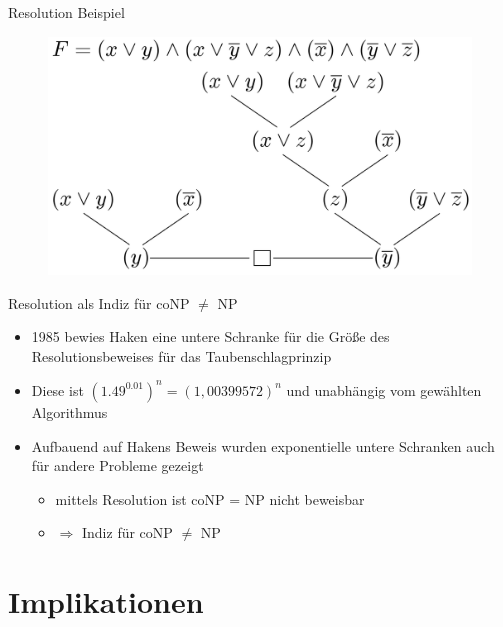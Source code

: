 \documentclass[ignorenonframetext,]{beamer}
\begin{document}
\begin{frame}{Resolution Beispiel}

\begin{figure}[htbp]
\centering
\includegraphics{img/res-beweis.png}
\end{figure}

\end{frame}

\begin{frame}{Resolution als Indiz für coNP $\neq$ NP}

\begin{itemize}
\itemsep1pt\parskip0pt
\item
  1985 bewies Haken eine untere Schranke für die Größe des
  Resolutionsbeweises für das Taubenschlagprinzip
\item
  Diese ist $(1.49^{0.01})^n = (1,00399572)^n$ und unabhängig vom
  gewählten Algorithmus
\item
  Aufbauend auf Hakens Beweis wurden exponentielle untere Schranken auch
  für andere Probleme gezeigt

  \begin{itemize}
  \itemsep1pt\parskip0pt
  \item
    mittels Resolution ist coNP = NP nicht beweisbar
  \item
    $\Rightarrow$ Indiz für coNP $\neq$ NP
  \end{itemize}
\end{itemize}

\end{frame}

\section{Implikationen}\label{implikationen}
\end{document}
